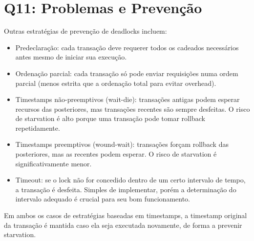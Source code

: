 \documentclass{beamer}
\begin{document}
\section{Q11: Problemas e Prevenção}


\begin{frame}
    Outras estratégias de prevenção de deadlocks incluem:

    \begin{itemize}
        \item Predeclaração: cada transação deve requerer todos os cadeados necessários antes mesmo de iniciar sua execução.
        \item Ordenação parcial: cada transação só pode enviar requisições numa ordem parcial (menos estrita que a ordenação total para evitar overhead).
        \item Timestamps não-preemptivos (wait-die): transações antigas podem esperar recursos das posteriores, mas transações recentes são sempre desfeitas. O risco de starvation é alto porque uma transação pode tomar rollback repetidamente.
        \item Timestamps preemptivos (wound-wait): transações forçam rollback das posteriores, mas as recentes podem esperar. O risco de starvation é significativamente menor.
    \end{itemize}

\end{frame}


\begin{frame}
    \begin{itemize}
        \item Timeout: se o lock não for concedido dentro de um certo intervalo de tempo, a transação é desfeita. Simples de implementar, porém a determinação do intervalo adequado é crucial para seu bom funcionamento.
    \end{itemize}
    
    Em ambos os casos de estratégias baseadas em timestamps, a timestamp original da transação é mantida caso ela seja executada novamente, de forma a prevenir starvation.
\end{frame}
\end{document}
